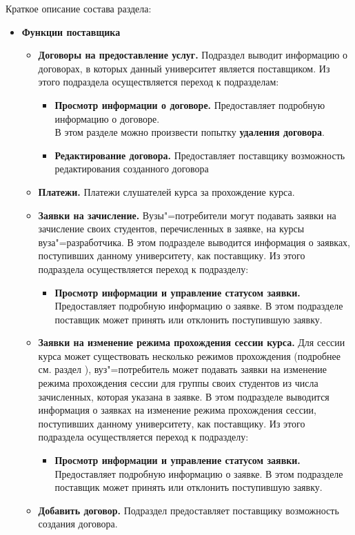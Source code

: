 Краткое описание состава раздела:
\begin{itemize}
	\item \textbf{Функции поставщика}
	\begin{itemize}
		\item \textbf{Договоры на предоставление услуг.} Подраздел выводит информацию о договорах, в которых данный университет является поставщиком. Из этого подраздела осуществляется переход к подразделам:
		\begin{itemize}
			\item \textbf{Просмотр информации о договоре.} Предоставляет подробную информацию о договоре. \\
			В этом разделе можно произвести попытку \textbf{удаления договора}.
			\item \textbf{Редактирование договора.} Предоставляет поставщику возможность редактирования созданного договора
		\end{itemize}
		\item \textbf{Платежи.} Платежи слушателей курса за прохождение курса.
		\item \textbf{Заявки на зачисление.} Вузы"=потребители могут подавать заявки на зачисление своих студентов, перечисленных в заявке, на курсы вуза"=разработчика. В этом подразделе выводится информация о заявках, поступивших данному университету, как поставщику.  Из этого подраздела осуществляется переход к подразделу:
		\begin{itemize}
			\item \textbf{Просмотр информации и управление статусом заявки.} Предоставляет подробную информацию о заявке. В этом подразделе поставщик может принять или отклонить поступившую заявку.
		\end{itemize}
		\item \textbf{Заявки на изменение режима прохождения сессии курса.} Для сессии курса может существовать несколько режимов прохождения (подробнее см. раздел ), вуз"=потребитель может подавать заявки на изменение режима прохождения сессии для группы своих студентов из числа зачисленных, которая указана в заявке. В этом подразделе выводится информация о заявках на изменение режима прохождения сессии, поступивших данному университету, как поставщику. Из этого подраздела осуществляется переход к подразделу:
		\begin{itemize}
			\item \textbf{Просмотр информации и управление статусом заявки.} Предоставляет подробную информацию о заявке. В этом подразделе поставщик может принять или отклонить поступившую заявку.
		\end{itemize}
		\item \textbf{Добавить договор.} Подраздел предоставляет поставщику возможность создания договора.
	\end{itemize}
	

\end{itemize}
